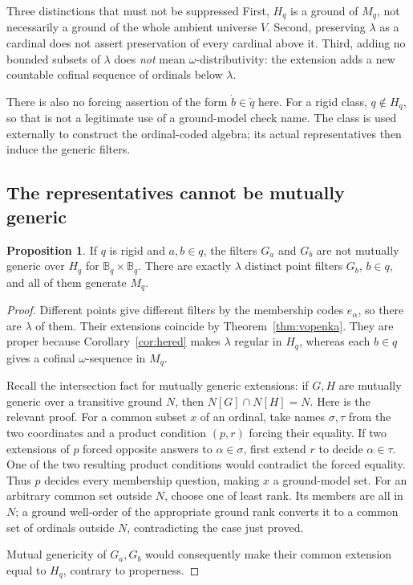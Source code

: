 \documentclass[11pt,letterpaper]{article}
\theoremstyle{definition}
\newtheorem{proposition}[definition]{Proposition}
\numberwithin{equation}{section}
\newcommand{\BB}{\mathbb B}
\begin{document}
\begin{assessment}{Three distinctions that must not be suppressed}
First, $H_q$ is a ground of $M_q$, not necessarily a ground of the whole
ambient universe $V$. Second, preserving $\lambda$ as a cardinal does
not assert preservation of every cardinal above it. Third, adding no
bounded subsets of $\lambda$ does \emph{not} mean
$\omega$-distributivity: the extension adds a new countable cofinal
sequence of ordinals below $\lambda$.
\end{assessment}

There is also no forcing assertion of the form
$\dot b\in\check q$ here. For a rigid class, $q\notin H_q$,
so that is not a legitimate use of a ground-model check name.
The class is used externally to construct the ordinal-coded algebra;
its actual representatives then induce the generic filters.

\subsection{The representatives cannot be mutually generic}

\begin{proposition}\label{prop:not-mutual}
If $q$ is rigid and $a,b\in q$, the filters $G_a$ and $G_b$ are not
mutually generic over $H_q$ for $\BB_q\times\BB_q$.
There are exactly $\lambda$ distinct point filters $G_b$, $b\in q$,
and all of them generate $M_q$.
\end{proposition}
\begin{proof}
Different points give different filters by the membership codes
$e_\alpha$, so there are $\lambda$ of them. Their extensions coincide
by Theorem~\ref{thm:vopenka}. They are proper because
Corollary~\ref{cor:hered} makes $\lambda$ regular in $H_q$, whereas
each $b\in q$ gives a cofinal $\omega$-sequence in $M_q$.

Recall the intersection fact for mutually generic extensions:
if $G,H$ are mutually generic over a transitive ground $N$, then
$N[G]\cap N[H]=N$. Here is the relevant proof.
For a common subset $x$ of an ordinal, take names $\sigma,\tau$ from
the two coordinates and a product condition $(p,r)$ forcing their equality.
If two extensions of $p$ forced opposite answers to
$\alpha\in\sigma$, first extend $r$ to decide $\alpha\in\tau$.
One of the two resulting product conditions would contradict the forced
equality. Thus $p$ decides every membership question, making $x$ a
ground-model set. For an arbitrary common set outside $N$, choose one
of least rank. Its members are all in $N$; a ground well-order of the
appropriate ground rank converts it to a common set of ordinals outside
$N$, contradicting the case just proved.

Mutual genericity of $G_a,G_b$ would consequently make their common
extension equal to $H_q$, contrary to properness.
\end{proof}
\end{document}
